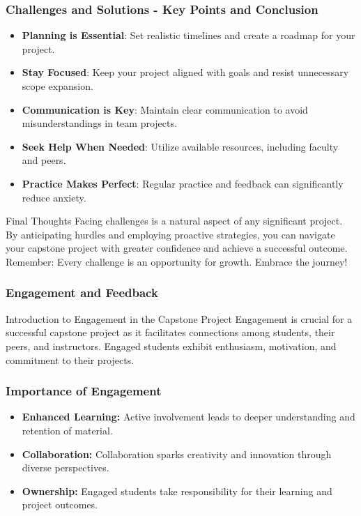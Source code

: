 \documentclass[aspectratio=169]{beamer}
\begin{document}
\begin{frame}[fragile]
    \frametitle{Challenges and Solutions - Key Points and Conclusion}
    \begin{itemize}
        \item \textbf{Planning is Essential}: Set realistic timelines and create a roadmap for your project.
        \item \textbf{Stay Focused}: Keep your project aligned with goals and resist unnecessary scope expansion.
        \item \textbf{Communication is Key}: Maintain clear communication to avoid misunderstandings in team projects.
        \item \textbf{Seek Help When Needed}: Utilize available resources, including faculty and peers.
        \item \textbf{Practice Makes Perfect}: Regular practice and feedback can significantly reduce anxiety.
    \end{itemize}

    \begin{block}{Final Thoughts}
        Facing challenges is a natural aspect of any significant project. 
        By anticipating hurdles and employing proactive strategies, you can navigate your capstone project with greater confidence and achieve a successful outcome. 
        Remember: Every challenge is an opportunity for growth. Embrace the journey!
    \end{block}
\end{frame}

\begin{frame}[fragile]
    \frametitle{Engagement and Feedback}
    \begin{block}{Introduction to Engagement in the Capstone Project}
        Engagement is crucial for a successful capstone project as it facilitates connections among students, their peers, and instructors. Engaged students exhibit enthusiasm, motivation, and commitment to their projects.
    \end{block}
\end{frame}

\begin{frame}[fragile]
    \frametitle{Importance of Engagement}
    \begin{itemize}
        \item \textbf{Enhanced Learning:} Active involvement leads to deeper understanding and retention of material.
        \item \textbf{Collaboration:} Collaboration sparks creativity and innovation through diverse perspectives.
        \item \textbf{Ownership:} Engaged students take responsibility for their learning and project outcomes.
    \end{itemize}
\end{frame}
\end{document}

